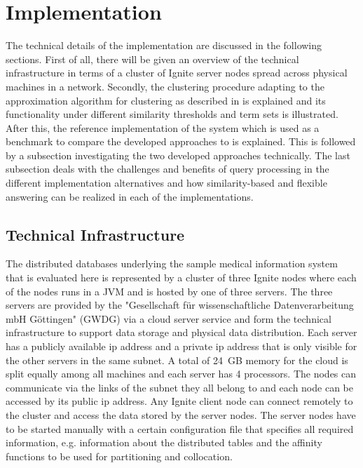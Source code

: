 
\section{Implementation}
\label{sec:impl}

The technical details of the implementation are discussed in the following sections. First of all, there will be given an overview of the technical 
infrastructure in terms of a cluster of Ignite server nodes spread across physical machines in a network. Secondly, the clustering procedure adapting to the 
approximation algorithm for clustering as described in \citet{Gonzales1985} is explained and its functionality under different similarity thresholds and term
sets is illustrated. After this, the reference implementation of the system which is used as a benchmark to compare the developed approaches to is explained.
This is followed by a subsection investigating the two developed approaches technically. The last subsection deals with the challenges and benefits of query
processing in the different implementation alternatives and how similarity-based and flexible answering can be realized in each of the implementations.



\subsection{Technical Infrastructure}

The distributed  databases underlying the sample medical information system that is evaluated here is represented by a cluster of three
Ignite nodes where each of the nodes runs in a JVM and is hosted by one of three servers. The three servers are provided by the "Gesellschaft für 
wissenschaftliche Datenverarbeitung mbH Göttingen" (GWDG) via a cloud server service and form the technical infrastructure to support data storage and physical
data distribution. Each server has a publicly available ip address and a private ip address that is only visible for the other servers in the same subnet. 
A total of 24~GB memory for the cloud is split equally among all machines and each server has 4 processors. The nodes can communicate via the links of the
subnet they all belong to and each node can be accessed by its public ip address. Any Ignite client node can connect remotely to the cluster and access the 
data stored by the server nodes. The server nodes have to be started manually with a certain configuration file that specifies all required information, e.g.
information about the distributed tables and the affinity functions to be used for partitioning and collocation.

